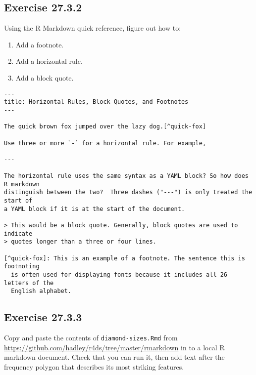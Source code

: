 \documentclass[]{book}
\providecommand{\tightlist}{%
  \setlength{\itemsep}{0pt}\setlength{\parskip}{0pt}}
\theoremstyle{plain}
\theoremstyle{remark}
\begin{document}
\hypertarget{exercise-27.3.2}{%
\subsection*{\texorpdfstring{Exercise
{27.3.2}}{Exercise 27.3.2}}\label{exercise-27.3.2}}

Using the R Markdown quick reference, figure out how to:

\begin{enumerate}
\def\labelenumi{\arabic{enumi}.}
\tightlist
\item
  Add a footnote.
\item
  Add a horizontal rule.
\item
  Add a block quote.
\end{enumerate}

\begin{verbatim}
---
title: Horizontal Rules, Block Quotes, and Footnotes
---

The quick brown fox jumped over the lazy dog.[^quick-fox]

Use three or more `-` for a horizontal rule. For example,

---

The horizontal rule uses the same syntax as a YAML block? So how does R markdown
distinguish between the two?  Three dashes ("---") is only treated the start of
a YAML block if it is at the start of the document.

> This would be a block quote. Generally, block quotes are used to indicate
> quotes longer than a three or four lines.

[^quick-fox]: This is an example of a footnote. The sentence this is footnoting
  is often used for displaying fonts because it includes all 26 letters of the
  English alphabet.
\end{verbatim}

\hypertarget{exercise-27.3.3}{%
\subsection*{\texorpdfstring{Exercise
{27.3.3}}{Exercise 27.3.3}}\label{exercise-27.3.3}}

Copy and paste the contents of \texttt{diamond-sizes.Rmd} from
\url{https://github.com/hadley/r4ds/tree/master/rmarkdown} in to a local
R markdown document. Check that you can run it, then add text after the
frequency polygon that describes its most striking features.
\end{document}
